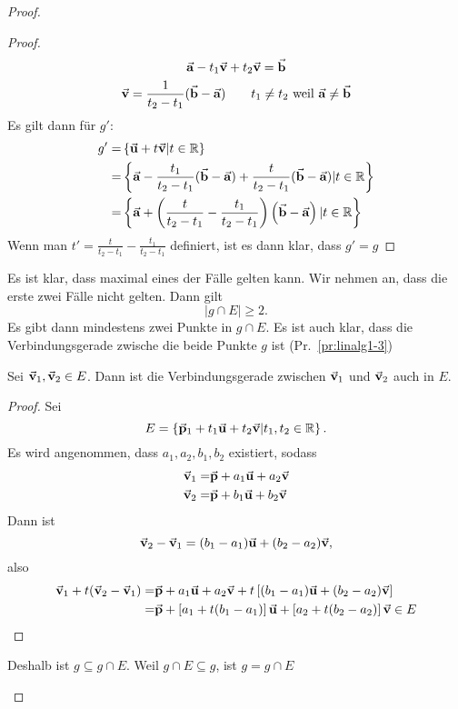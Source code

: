 \begin{proof}
\begin{parts}
\begin{proof}
\begin{gather*}
				\va a-t_1\va v+t_2\va v=\va b\\
				\va v = \frac{1}{t_2-t_1}(\va b - \va a)\qquad t_1\neq t_2\text{ weil }\va a \neq \va b
			\end{gather*}
			Es gilt dann f\"{u}r $g'$: 
			\begin{align*}
				g'=& \left\{ \va u+t\va v|t\in \mathbb{R} \right\} \\
				=& \left\{ \va a-\frac{t_1}{t_2-t_1}(\va b-\va a)+\frac{t}{t_2-t_1}(\va b-\va a)|t\in \mathbb{R} \right\}\\
				=& \left\{\va a+\left( \frac{t}{t_2-t_1}-\frac{t_1}{t_2-t_1} \right) \left( \va b -\va a \right) | t\in \mathbb{R} \right\}
			\end{align*}
			Wenn man $t'=\frac{t}{t_2-t_1}-\frac{t_1}{t_2-t_1}$ definiert, ist es dann klar, dass $g'=g$
		\end{proof}

			Es ist klar, dass maximal eines der F\"{a}lle gelten kann. Wir nehmen an, dass die erste zwei F\"{a}lle nicht gelten. Dann gilt
		\[
		|g\cap E|\ge 2
		.\] 
		Es gibt dann mindestens zwei Punkte in $g\cap E$. Es ist auch klar, dass die Verbindungsgerade zwische die beide Punkte $g$ ist (Pr.~\ref{pr:linalg1-3})


		\begin{Theorem}
			Sei $\va v_1, \va v_2\in E$. Dann ist die Verbindungsgerade zwischen $\va v_1$ und $\va v_2$ auch in $E$.
		\end{Theorem}
		\begin{proof}
			Sei
			\[
			E=\left\{ \va p_1+t_1\va u+t_2\va v|t_1,t_2\in \mathbb{R} \right\} 
			.\] 
			Es wird angenommen, dass $a_1,a_2,b_1,b_2$ existiert, sodass
			\begin{align*}
				\va v_1=& \va p+a_1\va u+a_2\va v\\
				\va v_2=&\va p+b_1\va u+b_2\va v
			\end{align*}
			Dann ist
			\[
			\va v_2-\va v_1=(b_1-a_1)\va u+(b_2-a_2)\va v,\]
			also
			\begin{align*}
				\va v_1+t(\va v_2-\va v_1)=& \va p+a_1\va u+a_2\va v+t\left[ (b_1-a_1)\va u+(b_2-a_2)\va v \right]\\
				=& \va p+\left[ a_1+t(b_1-a_1) \right] \va u+\left[ a_2+t(b_2-a_2) \right] \va v\in E
			\end{align*}
		\end{proof}

		Deshalb ist $g\subseteq g\cap E$. Weil $g\cap E\subseteq g$, ist $g=g\cap E$
	\end{parts}
\end{proof}
